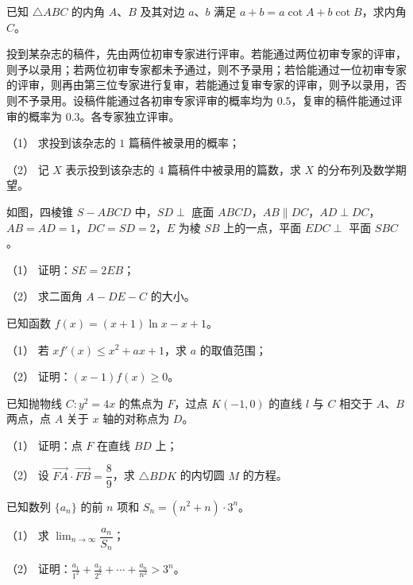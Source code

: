 \begin{question}
已知 $\triangle ABC$ 的内角 $A\text{、}B$ 及其对边 $a\text{、}b$ 满足 $a+b=a\cot A+b\cot B$，求内角 $C$。

\end{question}
\begin{question}
投到某杂志的稿件，先由两位初审专家进行评审。若能通过两位初审专家的评审，则予以录用；若两位初审专家都未予通过，则不予录用；若恰能通过一位初审专家的评审，则再由第三位专家进行复审，若能通过复审专家的评审，则予以录用，否则不予录用。设稿件能通过各初审专家评审的概率均为 $0.5$，复审的稿件能通过评审的概率为 $0.3$。各专家独立评审。

（1） 求投到该杂志的 $1$ 篇稿件被录用的概率；

（2） 记 $X$ 表示投到该杂志的 $4$ 篇稿件中被录用的篇数，求 $X$ 的分布列及数学期望。

\Needspace{0.4\textheight}
\end{question}
\begin{question}
如图，四棱锥 $S-ABCD$ 中，$SD\perp$ 底面 $ABCD$，$AB\parallel DC$，$AD\perp DC$，$AB=AD=1$，$DC=SD=2$，$E$ 为棱 $SB$ 上的一点，平面 $EDC\perp$ 平面 $SBC$。
\nopagebreak[4]
\begin{center}\end{center}
\nopagebreak[4]
（1） 证明：$SE=2EB$；

（2） 求二面角 $A-DE-C$ 的大小。

\end{question}
\begin{question}
已知函数 $f(x)=(x+1)\ln x-x+1$。

（1） 若 $xf'(x)\leq x^2+ax+1$，求 $a$ 的取值范围；

（2） 证明：$(x-1)f(x)\geq0$。

\end{question}
\begin{question}
已知抛物线 $C:y^2=4x$ 的焦点为 $F$，过点 $K(-1,0)$ 的直线 $l$ 与 $C$ 相交于 $A\text{、}B$ 两点，点 $A$ 关于 $x$ 轴的对称点为 $D$。

（1） 证明：点 $F$ 在直线 $BD$ 上；

（2） 设 $\overrightarrow{FA}\cdot\overrightarrow{FB}=\dfrac89$，求 $\triangle BDK$ 的内切圆 $M$ 的方程。

\end{question}
\begin{question}
已知数列 $\{a_n\}$ 的前 $n$ 项和 $S_n=(n^2+n)\cdot3^n$。

（1） 求 $\displaystyle\lim_{n\to\infty}\dfrac{a_n}{S_n}$；

（2） 证明：$\displaystyle\frac{a_1}{1^2}+\frac{a_2}{2^2}+\cdots+\frac{a_n}{n^2}>3^n$。

\end{question}